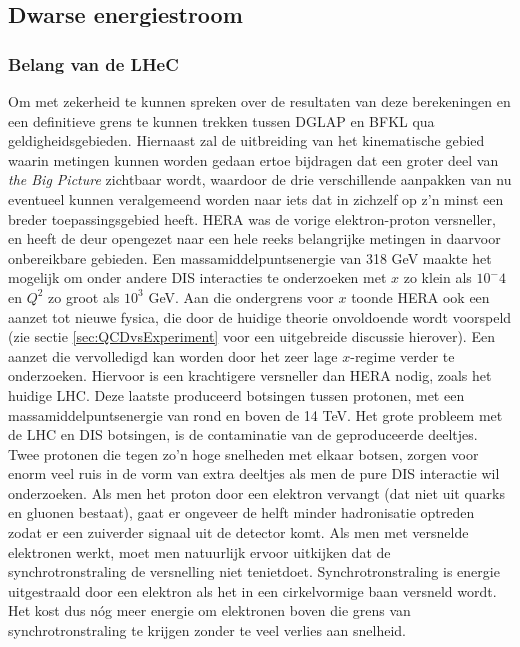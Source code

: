 \documentclass[a4paper,11pt]{article}
\numberwithin{equation}{section} %
\begin{document}
  \subsection{Dwarse energiestroom}
    \subsubsection{Belang van de LHeC}
Om met zekerheid te kunnen spreken over de resultaten van deze berekeningen en een definitieve grens te kunnen trekken tussen DGLAP en BFKL qua geldigheidsgebieden.
Hiernaast zal de uitbreiding van het kinematische gebied waarin metingen kunnen worden gedaan ertoe bijdragen dat een groter deel van \textit{the Big Picture} zichtbaar wordt, waardoor de drie verschillende aanpakken van nu eventueel kunnen veralgemeend worden naar iets dat in zichzelf op z’n minst een breder toepassingsgebied heeft.
HERA was de vorige elektron-proton versneller, en heeft de deur opengezet naar een hele reeks belangrijke metingen in daarvoor onbereikbare gebieden.
Een massamiddelpuntsenergie van 318 GeV maakte het mogelijk om onder andere DIS  interacties te onderzoeken met $x$ zo klein als $10^-4$ en $Q^2$ zo groot als $10^3$ GeV.
Aan die ondergrens voor $x$ toonde HERA ook een aanzet tot nieuwe fysica, die door de huidige theorie onvoldoende wordt voorspeld (zie sectie \ref{sec:QCDvsExperiment} voor een uitgebreide discussie hierover).
Een aanzet die vervolledigd kan worden door het zeer lage $x$-regime verder te onderzoeken.
Hiervoor is een krachtigere versneller dan HERA nodig, zoals het huidige LHC.
Deze laatste produceerd botsingen tussen protonen, met een massamiddelpuntsenergie van rond en boven de 14 TeV.
Het grote probleem met de LHC en DIS botsingen, is de contaminatie van de geproduceerde deeltjes.
Twee protonen die tegen zo’n hoge snelheden met elkaar botsen, zorgen voor enorm veel ruis in de vorm van extra deeltjes als men de pure DIS interactie wil onderzoeken.
Als men het proton door een elektron vervangt (dat niet uit quarks en gluonen bestaat), gaat er ongeveer de helft minder hadronisatie optreden zodat er een zuiverder signaal uit de detector komt.
Als men met versnelde elektronen werkt, moet men natuurlijk ervoor uitkijken dat de synchrotronstraling de versnelling niet tenietdoet.
Synchrotronstraling is energie uitgestraald door een elektron als het in een cirkelvormige baan versneld wordt.
Het kost dus nóg meer energie om elektronen boven die grens van synchrotronstraling te krijgen zonder te veel verlies aan snelheid.
\end{document}

